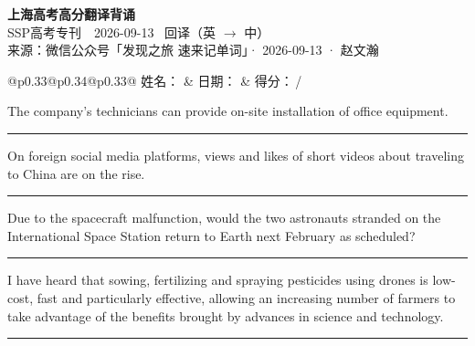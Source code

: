 \documentclass[11pt,a4paper]{article}
\newcommand{\num}[1]{\makebox[1.9em][r]{#1.}\hspace{0.3em}}
\newcommand{\wline}{\noindent\rule{\linewidth}{0.4pt}}
\begin{document}
\pagestyle{plain}
\begin{center}
{\LARGE\bfseries 上海高考高分翻译背诵 }\\[0.25em]
{\large SSP高考专刊　2026-09-13 \quad\ 回译（英 $\to$ 中）}\\[0.35em]
{\footnotesize 来源：微信公众号「发现之旅 速来记单词」· 2026-09-13 · 赵文瀚}
\end{center}

\vspace{0.4em}
\noindent\begin{tabular}{@{}p{0.33\textwidth}@{}p{0.34\textwidth}@{}p{0.33\textwidth}@{}}
姓名：\underline{\hspace{2.0cm}} & 日期：\underline{\hspace{2.0cm}} & 得分：\underline{\hspace{1.4cm}}\,/ \\
\end{tabular}

\vspace{0.5em}

\vspace{0.8em}
\num{1}The company’s technicians can provide on-site installation of office equipment.

\vspace{0.25em}

\wline

\num{2}On foreign social media platforms, views and likes of short videos about traveling to China are on the rise.

\vspace{0.25em}

\wline

\num{3}Due to the spacecraft malfunction, would the two astronauts stranded on the International Space Station return to Earth next February as scheduled?

\vspace{0.25em}

\wline

\num{4}I have heard that sowing, fertilizing and spraying pesticides using drones is low-cost, fast and particularly effective, allowing an increasing number of farmers to take advantage of the benefits brought by advances in science and technology.

\vspace{0.25em}

\wline
\end{document}
